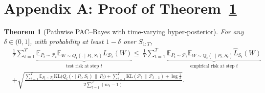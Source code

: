 \documentclass{article} %
\newtheorem{theorem}{Theorem}
\begin{document}
\section*{Appendix A: Proof of Theorem~\ref{thm:pathwise-pacbayes}}





\begin{theorem}[Pathwise PAC--Bayes with time-varying hyper-posterior]\label{thm:pathwise-pacbayes}
For any $\delta\in(0,1]$, with probability at least $1-\delta$ over $S_{1:T}$,
\begin{equation}\label{eq:main-bound}
\begin{aligned} 
& \frac{1}{T} \sum_{t=1}^T \underbrace{\mathbb{E}_{P_t \sim \mathcal{P}_t} \mathbb{E}_{W \sim Q_t(\cdot \mid P_t, S_t)} L_{\mathcal{D}_t}(W)}_{\text{test risk at step } t} 
\le \ \frac{1}{T} \sum_{t=1}^T \underbrace{\mathbb{E}_{P_t \sim \mathcal{P}_t} \mathbb{E}_{W \sim Q_t(\cdot \mid P_t, S_t)} \hat{L}_{S_t}(W)}_{\text{empirical risk at step } t} \\ 
& + \sqrt{\frac{ \sum_{t=1}^T \mathbb{E}_{P_t \sim \mathcal{P}_t} \mathrm{KL}\big(Q_t(\cdot \mid P_t, S_t) \,\|\, P_t\big) + \sum_{t=1}^T \mathrm{KL}(\mathcal{P}_t \,\|\, \mathcal{P}_{t-1}) + \log\frac{1}{\delta} }{2 \sum_{t=1}^T (m_t - 1)}}. 
\end{aligned} 
\end{equation}
\end{theorem}
\end{document}
